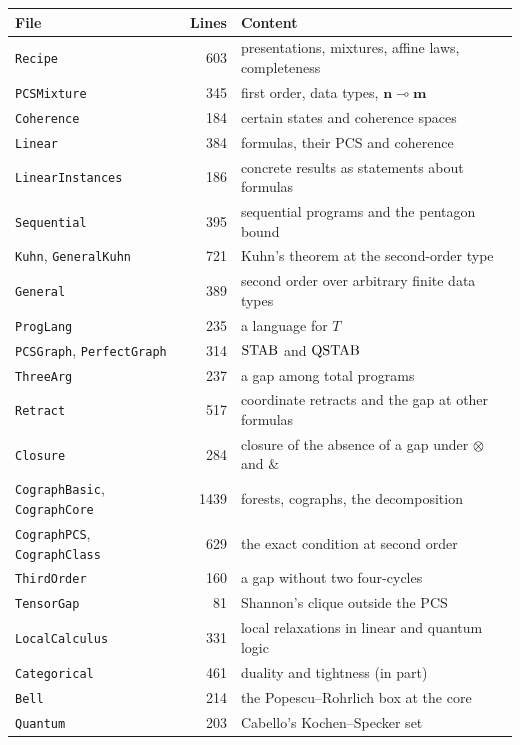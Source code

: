 \begin{center}
\small
\begin{tabular}{@{}lrl@{}}
\toprule
File & Lines & Content \\
\midrule
\texttt{Recipe} & 603 & presentations, mixtures, affine laws, completeness \\
\texttt{PCSMixture} & 345 & first order, data types, $\mathbf{n} \multimap \mathbf{m}$ \\
\texttt{Coherence} & 184 & certain states and coherence spaces \\
\texttt{Linear} & 384 & formulas, their PCS and coherence \\
\texttt{LinearInstances} & 186 & concrete results as statements about formulas \\
\texttt{Sequential} & 395 & sequential programs and the pentagon bound \\
\texttt{Kuhn}, \texttt{GeneralKuhn} & 721 & Kuhn's theorem at the second-order type \\
\texttt{General} & 389 & second order over arbitrary finite data types \\
\texttt{ProgLang} & 235 & a language for $T$ \\
\texttt{PCSGraph}, \texttt{PerfectGraph} & 314 & $\mathrm{STAB}$ and $\mathrm{QSTAB}$ \\
\texttt{ThreeArg} & 237 & a gap among total programs \\
\texttt{Retract} & 517 & coordinate retracts and the gap at other formulas \\
\texttt{Closure} & 284 & closure of the absence of a gap under $\otimes$ and $\mathbin{\&}$ \\
\texttt{CographBasic}, \texttt{CographCore} & 1439 & forests, cographs, the decomposition \\
\texttt{CographPCS}, \texttt{CographClass} & 629 & the exact condition at second order \\
\texttt{ThirdOrder} & 160 & a gap without two four-cycles \\
\texttt{TensorGap} & 81 & Shannon's clique outside the PCS \\
\texttt{LocalCalculus} & 331 & local relaxations in linear and quantum logic \\
\texttt{Categorical} & 461 & duality and tightness (in part) \\
\texttt{Bell} & 214 & the Popescu--Rohrlich box at the core \\
\texttt{Quantum} & 203 & Cabello's Kochen--Specker set \\
\bottomrule
\end{tabular}
\end{center}

